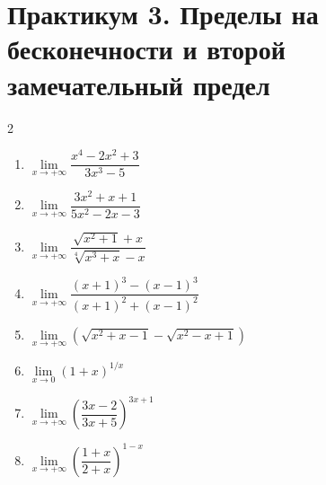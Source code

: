 \section*{Практикум 3. Пределы на бесконечности и второй замечательный предел}
\begin{multicols}{2}
\begin{enumerate}
\item$\lim\limits_{x\to+\infty}\dfrac{x^4-2x^2+3}{3x^3-5}$
\item$\lim\limits_{x\to+\infty}\dfrac{3x^2+x+1}{5x^2-2x-3}$
\item$\lim\limits_{x\to+\infty}\dfrac{\sqrt{x^2+1}+x}{\sqrt[4]{x^3+x}-x}$
\item$\lim\limits_{x\to+\infty}\dfrac{(x+1)^3-(x-1)^3}{(x+1)^2+(x-1)^2}$
\item$\lim\limits_{x\to+\infty}(\sqrt{x^2+x-1}-\sqrt{x^2-x+1})$
\item$\lim\limits_{x\to0}(1+x)^{1/x}$
\item$\lim\limits_{x\to+\infty}\left(\dfrac{3x-2}{3x+5}\right)^{3x+1}$
\item$\lim\limits_{x\to+\infty}\left(\dfrac{1+x}{2+x}\right)^{1-x}$
\end{enumerate}
\end{multicols}
